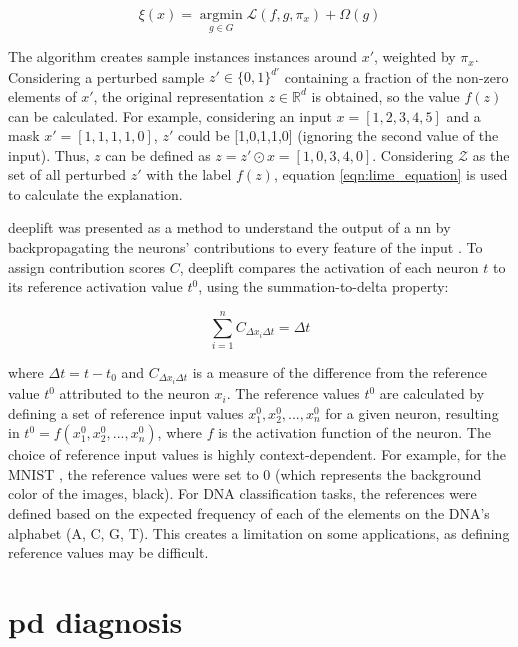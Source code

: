 \begin{equation}
\label{eqn:lime_equation}
\xi(x) = \operatorname*{argmin}_{g\in G} \mathcal{L}(f,g,\pi_x) + \Omega(g)
\end{equation}

The algorithm creates sample instances instances around $x'$, weighted by $\pi_x$. Considering a perturbed sample $ z' \in \{0,1\}^{d'}$ containing a fraction of the non-zero elements of $x'$, the original representation $z \in \mathbb{R}^d$ is obtained, so the value $f(z)$ can be calculated. For example, considering an input $x=[1,2,3,4,5]$ and a mask $x'=[1,1,1,1,0]$, $z'$ could be [1,0,1,1,0] (ignoring the second value of the input). Thus, $z$ can be defined as $z=z' \odot x=[1,0,3,4,0]$. Considering $\mathcal{Z}$ as the set of all perturbed $z'$ with the label $f(z)$, equation \ref{eqn:lime_equation} is used to calculate the explanation.  

\gls{deeplift} was presented as a method to understand the output of a \gls{nn} by backpropagating the neurons' contributions to every feature of the input \cite{DeepLIFT}. To assign contribution scores $C$, \gls{deeplift} compares the activation of each neuron $t$ to its reference activation value $t^0$, using the summation-to-delta property:

\begin{equation}
\sum_{i=1}^n C_{\Delta x_i \Delta t} = \Delta t
\end{equation}

where $ \Delta t = t - t_0 $ and $ C_{\Delta x_i \Delta t} $ is a measure of the difference from the reference value $t^0$ attributed to the neuron $ x_i $. The reference values $ t^0 $ are calculated by defining a set of reference input values $x_1^0, x_2^0,...,x_n^0$ for a given neuron, resulting in $ t^0 = f(x_1^0, x_2^0,...,x_n^0) $, where $f$ is the activation function of the neuron. The choice of reference input values is highly context-dependent. For example, for the MNIST \cite{MNIST}, the reference values were set to 0 (which represents the background color of the images, black). For DNA classification tasks, the references were defined based on the expected frequency of each of the elements on the DNA's alphabet (A, C, G, T). This creates a limitation on some applications, as defining reference values may be difficult.

\section{\acrlong{pd} diagnosis}

